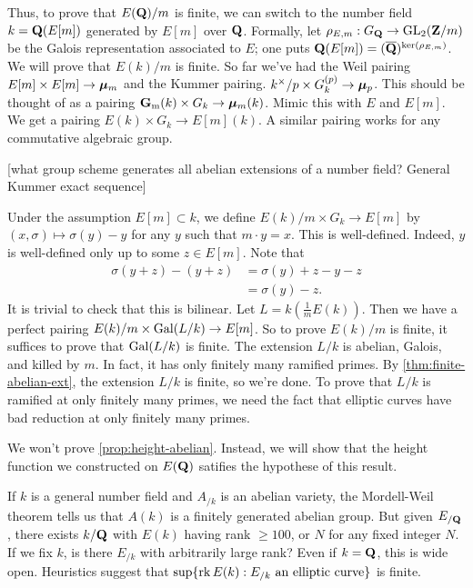 Thus, to prove that $E(\mathbf{Q})/m$ is finite, we can switch to the number field 
$k=\mathbf{Q}(E[m])$ generated by $E[m]$ over $\mathbf{Q}$. Formally, let 
$\rho_{E,m}:G_{\mathbf{Q}}\to \operatorname{GL}_2(\mathbf{Z}/m)$ be the Galois representation associated 
to $E$; one puts $\mathbf{Q}(E[m])=(\overline{\mathbf{Q}})^{\ker(\rho_{E,m})}$. We will prove 
that $E(k)/m$ is finite. So far we've had the Weil pairing 
$E[m]\times E[m]\to {\bm\mu}_m$ and the Kummer pairing. 
$k^\times/p\times G_k^{(p)}\to {\bm\mu}_p$. This should be thought of as a pairing 
$\mathbf{G}_\mathrm{m}(k)\times G_k\to {\bm\mu}_m(k)$. Mimic this with $E$ and $E[m]$. We get a 
pairing $E(k)\times G_k\to E[m](k)$. A similar pairing works for any 
commutative algebraic group. 

[what group scheme generates all abelian extensions of a number field?
General Kummer exact sequence]

Under the assumption $E[m]\subset k$, we define $E(k)/m\times G_k\to E[m]$ by 
$(x,\sigma)\mapsto \sigma(y)-y$ for any $y$ such that $m\cdot y=x$. 
This is well-defined. Indeed, $y$ is well-defined only up to some 
$z\in E[m]$. Note that 
\begin{align*}
  \sigma(y+z)-(y+z) 
    &= \sigma(y)+z-y-z \\
    &= \sigma(y)-z .
\end{align*}
It is trivial to check that this is bilinear. Let $L=k(\frac 1 m E(k))$. Then 
we have a perfect pairing $E(k)/m\times \operatorname{Gal}(L/k)\to E[m]$. So to prove 
$E(k)/m$ is finite, it suffices to prove that $\operatorname{Gal}(L/k)$ is finite. The 
extension $L/k$ is abelian, Galois, and killed by $m$. In fact, it has only 
finitely many ramified primes. By \autoref{thm:finite-abelian-ext}, the 
extension $L/k$ is finite, so we're done. To prove that $L/k$ is ramified 
at only finitely many primes, we need the fact that elliptic curves have 
bad reduction at only finitely many primes. 

We won't prove \autoref{prop:height-abelian}. Instead, we will show that the 
height function we constructed on $E(\mathbf{Q})$ satifies the hypothese of this 
result. 

If $k$ is a general number field and $A_{/k}$ is an abelian variety, the 
Mordell-Weil theorem tells us that $A(k)$ is a finitely generated abelian 
group. But given $E_{/\mathbf{Q}}$, there exists $k/\mathbf{Q}$ with $E(k)$ having rank 
$\geqslant 100$, or $N$ for any fixed integer $N$. If we fix $k$, is there 
$E_{/k}$ with arbitrarily large rank? Even if $k=\mathbf{Q}$, this is wide open. 
Heuristics suggest that $\sup\{\operatorname{rk} E(k):E_{/k}\text{ an elliptic curve}\}$ 
is finite. 

